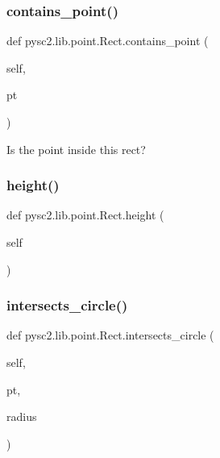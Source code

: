 \subsubsection{\texorpdfstring{contains\+\_\+point()}{contains\_point()}}
{\footnotesize\ttfamily def pysc2.\+lib.\+point.\+Rect.\+contains\+\_\+point (\begin{DoxyParamCaption}\item[{}]{self,  }\item[{}]{pt }\end{DoxyParamCaption})}

\begin{DoxyVerb}Is the point inside this rect?\end{DoxyVerb}
 \mbox{\label{classpysc2_1_1lib_1_1point_1_1_rect_a061a0ec9b597355317015b647f730bb0}} 
\subsubsection{\texorpdfstring{height()}{height()}}
{\footnotesize\ttfamily def pysc2.\+lib.\+point.\+Rect.\+height (\begin{DoxyParamCaption}\item[{}]{self }\end{DoxyParamCaption})}

\mbox{\label{classpysc2_1_1lib_1_1point_1_1_rect_a5d5843a9913820b8efca7dc21dfb0bd1}} 
\subsubsection{\texorpdfstring{intersects\+\_\+circle()}{intersects\_circle()}}
{\footnotesize\ttfamily def pysc2.\+lib.\+point.\+Rect.\+intersects\+\_\+circle (\begin{DoxyParamCaption}\item[{}]{self,  }\item[{}]{pt,  }\item[{}]{radius }\end{DoxyParamCaption})}

